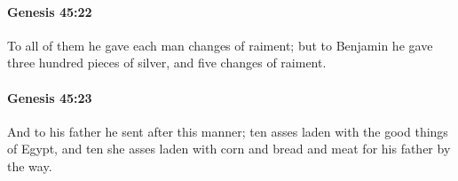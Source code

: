 		\paragraph{Genesis 45:22} %
			\label{GENESIS-45-22}

			To all of them he gave each man changes of raiment; but to Benjamin he gave three hundred pieces of silver, and five changes of raiment.


		\paragraph{Genesis 45:23} %
			\label{GENESIS-45-23}

			And to his father he sent after this manner; ten asses laden with the good things of Egypt, and ten she asses laden with corn and bread and meat for his father by the way.


